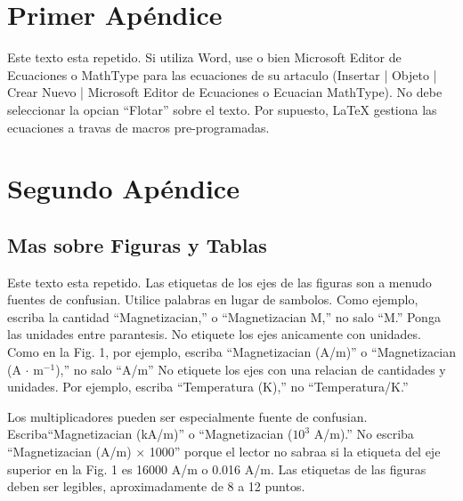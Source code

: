 \documentclass[5p,times,authoryear]{elsarticle}
\begin{document}






\appendix
\section{Primer Apéndice}    %
Este texto esta repetido. Si utiliza Word, use o bien Microsoft Editor de Ecuaciones o
MathType  para las ecuaciones de su artaculo (Insertar | Objeto |
Crear Nuevo | Microsoft Editor de Ecuaciones o Ecuacian MathType).
No debe seleccionar la opcian ``Flotar'' sobre el texto. Por
supuesto, LaTeX gestiona las ecuaciones a travas de macros
pre-programadas.

\section{Segundo Apéndice}

\subsection{Mas sobre Figuras y Tablas}

Este texto esta repetido. Las etiquetas de los ejes de las figuras son a menudo fuentes de
confusian. Utilice palabras en lugar de sambolos. Como ejemplo,
escriba la cantidad ``Magnetizacian,'' o ``Magnetizacian M,'' no
salo ``M.'' Ponga las unidades entre parantesis. No etiquete los
ejes anicamente con unidades. Como en la Fig. 1, por ejemplo,
escriba ``Magnetizacian (A/m)'' o ``Magnetizacian (A $\cdot$
m$^{-1}$),'' no salo ``A/m'' No etiquete los ejes con una relacian
de cantidades y unidades. Por ejemplo, escriba ``Temperatura (K),''
no ``Temperatura/K.''

Los multiplicadores pueden ser especialmente fuente de confusian.
Escriba``Magnetizacian (kA/m)'' o ``Magnetizacian ($10^3$ A/m).'' No
escriba ``Magnetizacian (A/m) $\times$ 1000'' porque el lector no
sabraa si la etiqueta del eje superior en la Fig. 1 es 16000 A/m o
0.016 A/m. Las etiquetas de las figuras deben ser legibles,
aproximadamente de 8 a 12 puntos.
\end{document}
